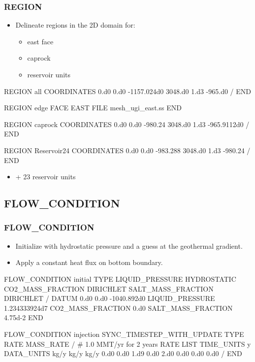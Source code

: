 \documentclass{beamer}
\begin{document}
\begin{frame}\frametitle{REGION}

\begin{itemize}
  \item Delineate regions in the 2D domain for:
  \begin{itemize}
    \item east face
    \item caprock
    \item reservoir units
  \end{itemize}
\end{itemize}

\begin{semiverbatim}
REGION all
  COORDINATES
    0.d0    0.d0 -1157.024d0
    3048.d0 1.d3 -965.d0
  /
END
\newpage

REGION edge
  FACE EAST
  FILE mesh_ugi_east.ss
END

\newpage
REGION caprock
  COORDINATES
    0.d0    0.d0 -980.24
    3048.d0 1.d3 -965.9112d0
  /
END

REGION Reservoir24
  COORDINATES
    0.d0    0.d0 -983.288
    3048.d0 1.d3 -980.24
  /
END

\begin{itemize}
  \item + 23 reservoir units
\end{itemize}

\end{semiverbatim}

\end{frame}

\subsection{FLOW\_CONDITION}

\begin{frame}\frametitle{FLOW\_CONDITION}

\begin{itemize}
\item Initialize with hydrostatic pressure and a guess at the geothermal gradient.
\item Apply a constant heat flux on bottom boundary.
\end{itemize}

\newpage
\begin{semiverbatim}
FLOW_CONDITION initial
  TYPE
    LIQUID_PRESSURE HYDROSTATIC
    CO2_MASS_FRACTION DIRICHLET
    SALT_MASS_FRACTION DIRICHLET
  /
  DATUM 0.d0 0.d0 -1040.892d0
  LIQUID_PRESSURE 1.234333924d7
  CO2_MASS_FRACTION 0.d0
  SALT_MASS_FRACTION 4.75d-2
END

\newpage
FLOW_CONDITION injection
  SYNC_TIMESTEP_WITH_UPDATE
  TYPE
    RATE MASS_RATE
  /
  # 1.0 MMT/yr for 2 years
  RATE LIST
    TIME_UNITS y
    DATA_UNITS kg/y kg/y kg/y
    0.d0 0.d0 1.d9 0.d0
    2.d0 0.d0 0.d0 0.d0
  /
END
\end{semiverbatim}

\end{frame}
\end{document}
